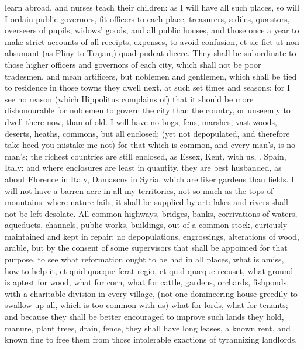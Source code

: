 {learn abroad, and nurses teach their children: as I will have all such
places, so will I ordain public governors, fit officers to each
place, treasurers, \ae{}diles, qu\ae{}stors, overseers of pupils, widows'
goods, and all public houses, \etc{} and those once a year to make strict
accounts of all receipts, expenses, to avoid confusion, et sic fiet ut
non absumant (as Pliny to Trajan,) quad pudeat dicere. They shall be
subordinate to those higher officers and governors of each city, which
shall not be poor tradesmen, and mean artificers, but noblemen and
gentlemen, which shall be tied to residence in those towns they dwell
next, at such set times and seasons: for I see no reason (which
Hippolitus complains of) that it should be more dishonourable for
noblemen to govern the city than the country, or unseemly to dwell
there now, than of old. I will have no bogs, fens, marshes, vast
woods, deserts, heaths, commons, but all enclosed; (yet not
depopulated, and therefore take heed you mistake me not) for that which
is common, and every man's, is no man's; the richest countries are
still enclosed, as Essex, Kent, with us, \etc{}. Spain, Italy; and where
enclosures are least in quantity, they are best husbanded, as
about Florence in Italy, Damascus in Syria, \etc{} which are liker gardens
than fields. I will not have a barren acre in all my territories, not
so much as the tops of mountains: where nature fails, it shall be
supplied by art: lakes and rivers shall not be left desolate. All
common highways, bridges, banks, corrivations of waters, aqueducts,
channels, public works, buildings, \etc{} out of a common stock,
curiously maintained and kept in repair; no depopulations, engrossings,
alterations of wood, arable, but by the consent of some supervisors
that shall be appointed for that purpose, to see what reformation ought
to be had in all places, what is amiss, how to help it, et quid qu\ae{}que
ferat regio, et quid qu\ae{}que recuset, what ground is aptest for wood,
what for corn, what for cattle, gardens, orchards, fishponds, \etc{} with
a charitable division in every village, (not one domineering house
greedily to swallow up all, which is too common with us) what for
lords, what for tenants; and because they shall be better
encouraged to improve such lands they hold, manure, plant trees, drain,
fence, \etc{} they shall have long leases, a known rent, and known fine to
free them from those intolerable exactions of tyrannizing landlords.

}
